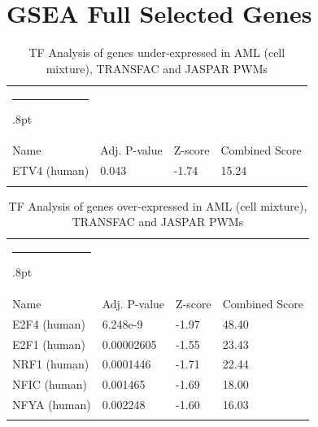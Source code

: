 \documentclass[3p,authoryear,preprint,12pt]{elsarticle}
\makeatletter
\def\hlinewd#1{%
  \noalign{\ifnum0=`}\fi\hrule \@height #1%
  \futurelet\reserved@a\@xhline}
\def\tbltoprule{\hlinewd{.8pt}\\[-12pt]}
\def\tblbottomrule{\noalign{\vspace*{6pt}}\hline\noalign{\vspace*{2pt}}}
\def\tblmidrule{\noalign{\vspace*{6pt}}\hline\noalign{\vspace*{2pt}}}
\makeatother
\begin{document}
\section{GSEA Full Selected Genes}\label{appendix-title-fe590e9f8eaf}
\begin{table}[!htbp]
	\caption{{TF Analysis of genes under-expressed in AML (cell mixture), TRANSFAC and JASPAR PWMs} }
	\label{tw-de478ae31ce6}
	\def\arraystretch{1}
	\ignorespaces 
	\centering 
	\begin{tabulary}{\linewidth}{p{\dimexpr.65\tabcolsep}p{\dimexpr.15\tabcolsep}p{\dimexpr.1\tabcolsep}p{\dimexpr.1\tabcolsep}}
		\tbltoprule Name & Adj. P-value & Z-score & Combined Score\\
		\tblmidrule 
ETV4 (human) & 0.043 & -1.74 & 15.24  \\
		\tblbottomrule
	\end{tabulary}\par 
\end{table}
\begin{table}[!htbp]
	\caption{{TF Analysis of genes over-expressed in AML (cell mixture), TRANSFAC and JASPAR PWMs} }
	\label{tw-de478ae31cf6}
	\def\arraystretch{1}
	\ignorespaces 
	\centering 
	\begin{tabulary}{\linewidth}{p{\dimexpr.65\tabcolsep}p{\dimexpr.15\tabcolsep}p{\dimexpr.1\tabcolsep}p{\dimexpr.1\tabcolsep}}
		\tbltoprule Name & Adj. P-value & Z-score & Combined Score\\
		\tblmidrule 
E2F4 (human) & 6.248e-9 & -1.97 & 48.40 \\
E2F1 (human) & 0.00002605 & -1.55 & 23.43 \\
NRF1 (human) & 0.0001446 & -1.71 & 22.44 \\
NFIC (human) & 0.001465 & -1.69 & 18.00 \\
NFYA (human) & 0.002248 & -1.60 & 16.03 \\
		\tblbottomrule
	\end{tabulary}\par 
\end{table}
\end{document}
